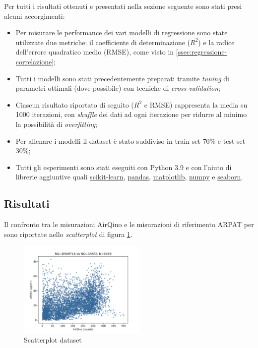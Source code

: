 Per tutti i risultati ottenuti e presentati nella sezione seguente sono stati presi alcuni accorgimenti:
\begin{itemize}
  \item Per misurare le performance dei vari modelli di regressione sono state utilizzate due metriche: il coefficiente di determinazione ($R^2$) e la radice dell'errore quadratico medio (RMSE), come visto in \ref{ssec:regressione-correlazione};
  \item Tutti i modelli sono stati precedentemente preparati tramite \textit{tuning} di parametri ottimali (dove possibile) con tecniche di \textit{cross-validation};
  \item Ciascun risultato riportato di seguito ($R^2$ e RMSE) rappresenta la media su 1000 iterazioni, con \textit{shuffle} dei dati ad ogni iterazione per ridurre al minimo la possibilità di \textit{overfitting};
  \item Per allenare i modelli il dataset è stato suddiviso in train set 70\% e test set 30\%;
  \item Tutti gli esperimenti sono stati eseguiti con Python 3.9 e con l'aiuto di librerie aggiuntive quali \url{scikit-learn}, \url{pandas}, \url{matplotlib}, \url{numpy} e \url{seaborn}.
\end{itemize}

\subsection{Risultati }\label{ssec:risultati-no2}

Il confronto tra le misurazioni AirQino e le misurazioni di riferimento ARPAT per  sono riportate nello \textit{scatterplot} di figura \ref{fig:scatterplot_no2}.

\begin{figure}[H]
\centering
\includegraphics[width=0.55\textwidth,height=\textheight,keepaspectratio]{img/sc_no2.png}
\caption{Scatterplot dataset }
\label{fig:scatterplot_no2}
\end{figure}


